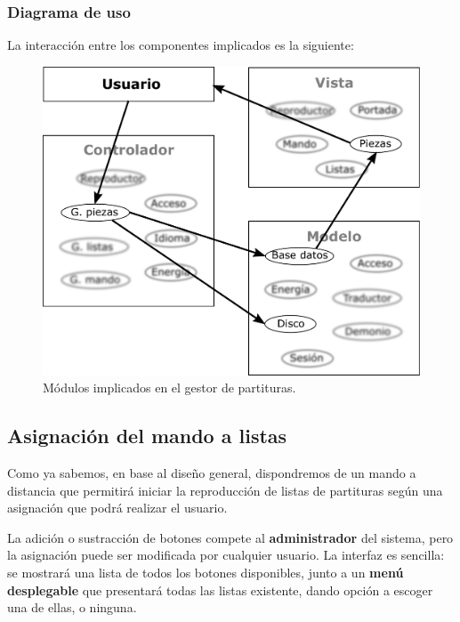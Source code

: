 \subsubsection{Diagrama de uso}

La interacción entre los componentes implicados es la siguiente:

\smallskip

\begin{figure}[H]
	\noindent \begin{centering}
		\includegraphics[width=\linewidth/2]{capitulo4/mvc_piezas}
		\par\end{centering}
	\smallskip
	\caption{\label{fig:mvc_piezas} Módulos implicados en el gestor de partituras.}
\end{figure} 

\smallskip

\subsection{Asignación del mando a listas}
\label{subsec:mando}

Como ya sabemos, en base al diseño general, dispondremos de un mando a distancia que permitirá iniciar la reproducción de listas de partituras según una asignación que podrá realizar el usuario.

La adición o sustracción de botones compete al \textbf{administrador} del sistema, pero la asignación puede ser modificada por cualquier usuario. La interfaz es sencilla: se mostrará una lista de todos los botones disponibles, junto a un \textbf{menú desplegable} que presentará todas las listas existente, dando opción a escoger una de ellas, o ninguna.

